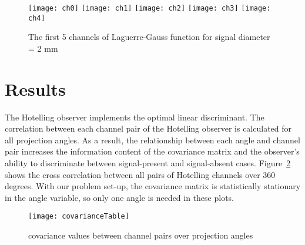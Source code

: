 \begin{figure}[ht]
\texttt{[image: ch0]}
\texttt{[image: ch1]}
\texttt{[image: ch2]}
\texttt{[image: ch3]}
\texttt{[image: ch4]} 
\caption{The first 5 channels of Laguerre-Gauss function for signal diameter = 2 mm}
\label{fig: channel template} 
\end{figure}

\section{Results}
The Hotelling observer implements the optimal linear discriminant. The correlation between each channel pair of the Hotelling observer is calculated for all projection angles.  As a result, the relationship between each angle and channel pair increases the information content of the covariance matrix and the observer's ability to discriminate between signal-present and signal-absent cases. Figure~\ref{fig: covarianceTable} shows the cross correlation between all pairs of Hotelling channels over 360 degrees.  With our problem set-up, the covariance matrix is statistically stationary in the angle variable, so only one angle is needed in these plots.

\begin{figure}[ht]
\texttt{[image: covarianceTable]}
\caption{covariance values between channel pairs over projection angles}
\label{fig: covarianceTable}
\end{figure}

